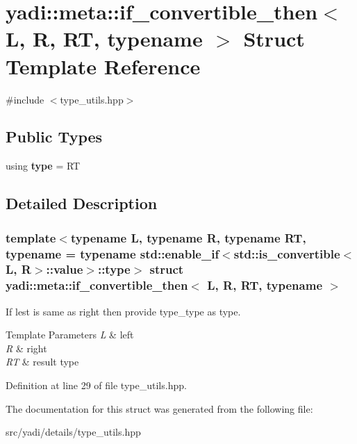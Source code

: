 \hypertarget{structyadi_1_1meta_1_1if__convertible__then}{}\section{yadi\+:\+:meta\+:\+:if\+\_\+convertible\+\_\+then$<$ L, R, RT, typename $>$ Struct Template Reference}
\label{structyadi_1_1meta_1_1if__convertible__then}


{\ttfamily \#include $<$type\+\_\+utils.\+hpp$>$}

\subsection*{Public Types}
\begin{DoxyCompactItemize}
\item 
\mbox{\label{structyadi_1_1meta_1_1if__convertible__then_af5f58c3e86c8f9a05a918090e86d618f}} 
using {\bfseries type} = RT
\end{DoxyCompactItemize}


\subsection{Detailed Description}
\subsubsection*{template$<$typename L, typename R, typename RT, typename = typename std\+::enable\+\_\+if$<$std\+::is\+\_\+convertible$<$\+L, R$>$\+::value$>$\+::type$>$\newline
struct yadi\+::meta\+::if\+\_\+convertible\+\_\+then$<$ L, R, R\+T, typename $>$}

If lest is same as right then provide type\+\_\+type as type. 
\begin{DoxyTemplParams}{Template Parameters}
{\em L} & left \\
\hline
{\em R} & right \\
\hline
{\em RT} & result type \\
\hline
\end{DoxyTemplParams}


Definition at line 29 of file type\+\_\+utils.\+hpp.



The documentation for this struct was generated from the following file\+:\begin{DoxyCompactItemize}
\item 
src/yadi/details/type\+\_\+utils.\+hpp\end{DoxyCompactItemize}
